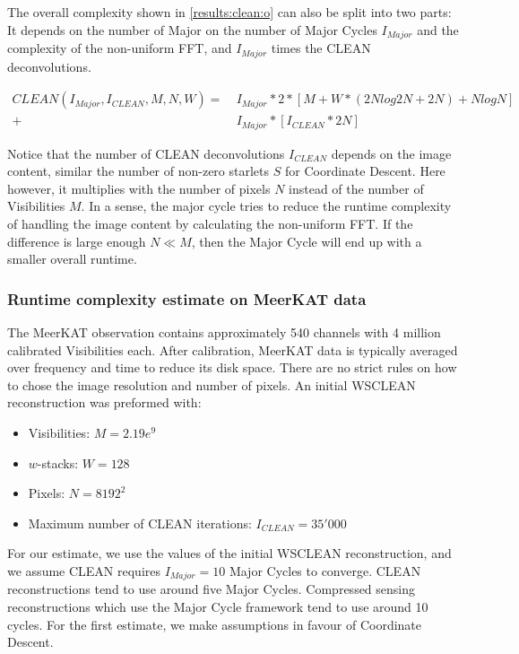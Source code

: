 The overall complexity shown in \eqref{results:clean:o} can also be split into two parts: It depends on the number of Major on the number of Major Cycles $I_{Major}$ and the complexity of the non-uniform FFT, and $I_{Major}$ times the CLEAN deconvolutions. 

\begin{equation}\label{results:clean:o}
\begin{aligned}
 CLEAN(I_{Major}, I_{CLEAN}, M, N,  W) =\: &I_{Major} * 2 * [M + W*(2N log 2N + 2N) + N log N]\\
+ &I_{Major} * [I_{CLEAN}*2N]
\end{aligned}
\end{equation}

Notice that the number of CLEAN deconvolutions $I_{CLEAN}$ depends on the image content, similar the number of non-zero starlets $S$ for Coordinate Descent. Here however, it multiplies with the number of pixels $N$ instead of the number of Visibilities $M$. In a sense, the major cycle tries to reduce the runtime complexity of handling the image content by calculating the non-uniform FFT. If the difference is large enough $N \ll M$, then the Major Cycle will end up with a smaller overall runtime.


\subsubsection{Runtime complexity estimate on MeerKAT data}
The MeerKAT observation contains approximately 540 channels with 4 million calibrated Visibilities each. After calibration, MeerKAT data is typically averaged over frequency and time to reduce its disk space. There are no strict rules on how to chose the image resolution and number of pixels. An initial WSCLEAN reconstruction was preformed with:
\begin{itemize}
	\item Visibilities: $M=2.19e^9$
	\item $w$-stacks: $W = 128$
	\item Pixels: $N = 8192^2$
	\item Maximum number of CLEAN iterations: $I_{CLEAN} = 35'000$
\end{itemize}

For our estimate, we use the values of the initial WSCLEAN reconstruction, and we assume CLEAN requires $I_{Major}=10$ Major Cycles to converge. CLEAN reconstructions tend to use around five Major Cycles. Compressed sensing reconstructions which use the Major Cycle framework tend to use around 10 cycles. For the first estimate, we make assumptions in favour of Coordinate Descent.

